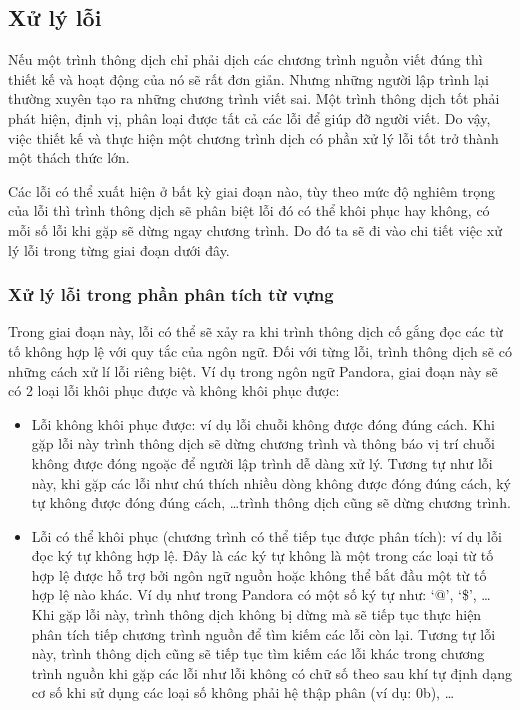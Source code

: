 \subsection{Xử lý lỗi}
Nếu một trình thông dịch chỉ phải dịch các chương trình nguồn viết đúng thì thiết kế và hoạt động của nó sẽ rất đơn giản. Nhưng những người lập trình lại thường xuyên tạo ra những chương trình viết sai. Một trình thông dịch tốt phải phát hiện, định vị, phân loại được tất cả các lỗi để giúp đỡ người viết. Do vậy, việc thiết kế và thực hiện một chương trình dịch có phần xử lý lỗi tốt trở thành một thách thức lớn.

Các lỗi có thể xuất hiện ở bất kỳ giai đoạn nào, tùy theo mức độ nghiêm trọng của lỗi thì trình thông dịch sẽ phân biệt lỗi đó có thể khôi phục hay không, có mỗi số lỗi khi gặp sẽ dừng ngay chương trình. Do đó ta sẽ đi vào chi tiết việc xử lý lỗi trong từng giai đoạn dưới đây.

\subsubsection{Xử lý lỗi trong phần phân tích từ vựng}
Trong giai đoạn này, lỗi có thể sẽ xảy ra khi trình thông dịch cố gắng đọc các từ tố không hợp lệ với quy tắc của ngôn ngữ. Đối với từng lỗi, trình thông dịch sẽ có những cách xử lí lỗi riêng biệt. Ví dụ trong ngôn ngữ Pandora, giai đoạn này sẽ có 2 loại lỗi khôi phục được và không khôi phục được:

\begin{itemize}
    \item Lỗi không khôi phục được: ví dụ lỗi chuỗi không được đóng đúng cách. Khi gặp lỗi này trình thông dịch sẽ dừng chương trình và thông báo vị trí chuỗi không được đóng ngoặc để người lập trình dễ dàng xử lý. Tương tự như lỗi này, khi gặp các lỗi như chú thích nhiều dòng không được đóng đúng cách, ký tự không được đóng đúng cách, \dots trình thông dịch cũng sẽ dừng chương trình.
    \item Lỗi có thể khôi phục (chương trình có thể tiếp tục được phân tích): ví dụ lỗi đọc ký tự không hợp lệ. Đây là các ký tự không là một trong các loại từ tố hợp lệ được hỗ trợ bởi ngôn ngữ nguồn hoặc không thể bắt đầu một từ tố hợp lệ nào khác. Ví dụ như trong Pandora có một số ký tự như: `@', `\$', \dots Khi gặp lỗi này, trình thông dịch không bị dừng mà sẽ tiếp tục thực hiện phân tích tiếp chương trình nguồn để tìm kiếm các lỗi còn lại. Tương tự lỗi này, trình thông dịch cũng sẽ tiếp tục tìm kiếm các lỗi khác trong chương trình nguồn khi gặp các lỗi như lỗi không có chữ số theo sau khí tự định dạng cơ số khi sử dụng các loại số không phải hệ thập phân (ví dụ: 0b), \dots
\end{itemize}

